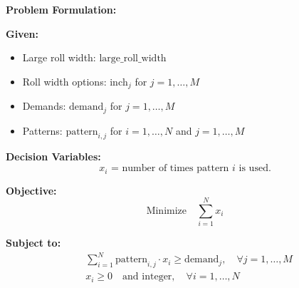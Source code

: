 \documentclass{article}
\begin{document}
\textbf{Problem Formulation:}

\textbf{Given:}
\begin{itemize}
    \item Large roll width: $\text{large\_roll\_width}$
    \item Roll width options: $\text{inch}_j$ for $j = 1, \ldots, M$
    \item Demands: $\text{demand}_j$ for $j = 1, \ldots, M$
    \item Patterns: $\text{pattern}_{i,j}$ for $i = 1, \ldots, N$ and $j = 1, \ldots, M$
\end{itemize}

\textbf{Decision Variables:}
\[
x_i \text{ = number of times pattern } i \text{ is used.}
\]

\textbf{Objective:}
\[
\text{Minimize} \quad \sum_{i=1}^{N} x_i
\]

\textbf{Subject to:}
\begin{align*}
    &\sum_{i=1}^{N} \text{pattern}_{i,j} \cdot x_i \geq \text{demand}_j, \quad \forall j = 1, \ldots, M \\
    &x_i \geq 0 \quad \text{and integer}, \quad \forall i = 1, \ldots, N
\end{align*}
\end{document}
